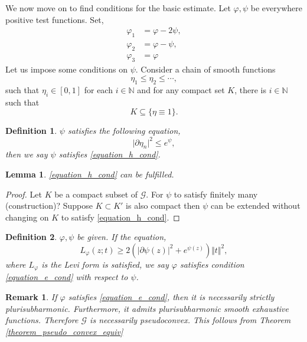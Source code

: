 \documentclass{article}
\newtheorem{definition}{Definition}[section]
\newtheorem{lemma}{Lemma}[section]
\newtheorem{remark}{Remark}[section]
\newcommand{\norm}[1]{\Vert #1 \Vert}
\newcommand{\N}[0]{\mathbb{N}}
\newcommand{\G}[0]{\mathcal{G}}
\begin{document}
We now move on to find conditions for the basic estimate. Let $\varphi,\psi$ be everywhere positive test functions. Set,
\begin{align*}
  \varphi_1 & = \varphi-2\psi,\\
  \varphi_2 & = \varphi-\psi,\\
  \varphi_3 & = \varphi
\end{align*}
Let us impose some conditions on $\psi$. Consider a chain of smooth functions
\begin{equation*}
  \eta_1\leq\eta_2\leq\cdots,
\end{equation*}
such that $\eta_i\in[0,1]$ for each $i\in\N$ and for any compact set $K$, there is $i\in\N$ such that 
\begin{equation*}
  K\subseteq \{\eta\equiv 1\}.
\end{equation*}
\begin{definition}
  $\psi$ satisfies the following equation,
  \begin{equation*}
    \vert \partial\eta_n\vert^2\leq e^\psi,\tag{H}\label{equation_h_cond}
  \end{equation*}
  then we say $\psi$ satisfies \eqref{equation_h_cond}.
\end{definition}
\begin{lemma}
  \eqref{equation_h_cond} can be fulfilled.
\end{lemma}
\begin{proof}
  Let $K$ be a compact subset of $\G$. For $\psi$ to satisfy finitely many (construction)? Suppose $K\subset K'$ is also compact then $\psi$ can be extended without changing on $K$ to satisfy \eqref{equation_h_cond}. %
\end{proof}
\begin{definition}
  $\varphi,\psi$ be given. If the equation,
  \begin{equation*}
    L_\varphi(z;t)\geq 2(\vert\partial\psi(z)\vert^2+e^{\psi(z)})\norm{t}^2,\tag{E}\label{equation_e_cond}
  \end{equation*}
  where $L_\varphi$ is the Levi form is satisfied, we say $\varphi$ satisfies condition \eqref{equation_e_cond} with respect to $\psi$.
\end{definition}
\begin{remark}
  If $\varphi$ satisfies \eqref{equation_e_cond}, then it is necessarily strictly plurisubharmonic. Furthermore, it admits plurisubharmonic smooth exhaustive functions. Therefore $\G$ is necessarily pseudoconvex. This follows from Theorem \ref{theorem_pseudo_convex_equiv}
\end{remark}
\end{document}

